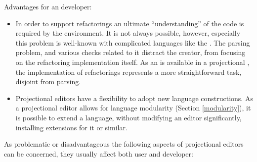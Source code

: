   
  Advantages for an  developer:
  
  \begin{itemize}
  
  \item In order to support refactorings an ultimate ``understanding'' of the code is required by the environment. 
  It is not always possible, however, especially this problem is well-known with complicated languages like the \cpppl.
  The parsing problem, and various checks related to it distract the  creator, from focusing on the refactoring 
  implementation itself. As an  is available in a projectional , the implementation  of refactorings represents
  a more straightforward task, disjoint from parsing.
%   
%     
  
  \item Projectional editors have a flexibility to adopt new language constructions. 
  As a projectional editor allows for language modularity (Section \ref{modularity}), it is possible to extend a language, 
  without modifying an editor significantly, installing extensions for it or similar.
  
   
 \end{itemize}
 
 
 As problematic or disadvantageous the following aspects of projectional editors can be concerned, they usually affect both 
 user and developer:
 
